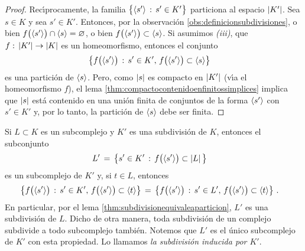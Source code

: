 \begin{proof}
	Rec\'{\i}procamente, la familia
	$\big\{\langle s'\rangle\,:\,s'\in K'\big\}$ particiona al espacio
	$\left|K'\right|$. Sea $s\in K$ y sea $s'\in K'$. Entonces, por la
	observaci\'{o}n \ref{obs:definicionsubdivisiones}, o bien
	$f\big(\langle s'\rangle\big)\cap\langle s\rangle=\varnothing$, o bien
	$f\big(\langle s'\rangle\big)\subset\langle s\rangle$. Si
	asumimos \emph{(iii)}, que $f:\,\left|K'\right|\rightarrow\left|K\right|$ es un
	homeomorfismo, entonces el conjunto
	\begin{align*}
		& \big\{f\big(\langle s'\rangle\big)\,:\,
			s'\in K',\,f\big(\langle s'\rangle\big)\subset
				\langle s\rangle\big\}
	\end{align*}
	es una partici\'{o}n de $\langle s\rangle$. Pero, como $\left|s\right|$
	es compacto en $\left|K'\right|$ (v\'{\i}a el homeomorfismo $f$), el
	lema \ref{thm:compactocontenidoenfinitossimplices} implica que
	$\left|s\right|$ est\'{a} contenido en una uni\'{o}n finita de conjuntos de
	la forma $\langle s'\rangle$ con $s'\in K'$ y, por lo tanto, la
	partici\'{o}n de $\langle s\rangle$ debe ser finita.
\end{proof}

\begin{obsSubdividirUnSubcomplejo}\label{obs:subdividirunsubcomplejo}
	Si $L\subset K$ es un subcomplejo y $K'$ es una subdivisi\'{o}n de $K$,
	entonces el subconjunto
	\begin{align*}
		L' & \,=\,\big\{s'\in K'\,:\,f\big(\langle s'\rangle\big)
			\subset\left|L\right|\big\}
	\end{align*}
	es un subcomplejo de $K'$ y, si $t\in L$, entonces
	\begin{align*}
		\big\{f\big(\langle s'\rangle\big)\,:\,s'\in K',\,
			f\big(\langle s'\rangle\big)\subset\langle t\rangle
				\big\} & \,=\,
		\big\{f\big(\langle s'\rangle\big)\,:\,s'\in L',\,
			f\big(\langle s'\rangle\big)\subset\langle t\rangle
				\big\}
		\text{ .}
	\end{align*}
	En particular, por el lema \ref{thm:subdivisionequivaleaparticion},
	$L'$ es una subdivisi\'{o}n de $L$. Dicho de otra manera, toda
	subdivisi\'{o}n de un complejo subdivide a todo subcomplejo
	tambi\'{e}n. Notemos que $L'$ es el \'{u}nico subcomplejo de $K'$ con
	esta propiedad. Lo llamamos \emph{la subdivisi\'{o}n inducida por %
	$K'$}.
\end{obsSubdividirUnSubcomplejo}

